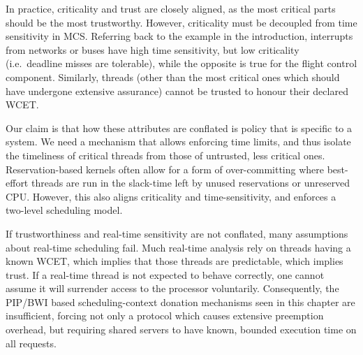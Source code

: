 In practice, criticality and trust are closely aligned, as the most
critical parts should be the most trustworthy.
However, criticality must be decoupled from time sensitivity in MCS.
Referring back to the
example in the introduction, interrupts from networks or buses have
high time sensitivity, but low criticality (i.e.\ deadline misses are
tolerable), while the opposite is true for the flight control component.
Similarly, threads (other than the most critical ones which should
have undergone extensive assurance) cannot be
trusted to honour their declared WCET.

Our claim is that how these attributes are conflated is
policy that is specific to a system.
We need a mechanism that allows  enforcing time limits, and thus
isolate the timeliness of critical threads from those of untrusted,
less critical ones.
Reservation-based kernels often allow for a form of over-committing where
best-effort threads are run in the slack-time left by unused reservations or unreserved CPU.
However, this also aligns criticality and time-sensitivity, and
enforces a two-level scheduling model.

If trustworthiness and real-time sensitivity are not conflated, many assumptions about real-time
scheduling fail.
Much real-time analysis rely on threads having a known \gls{WCET}, which implies that those threads
are predictable, which implies trust.
If a real-time thread is not expected to behave correctly, one cannot
assume it will surrender access to the processor voluntarily.
Consequently, the \gls{PIP}/\gls{BWI} based scheduling-context donation mechanisms seen in this chapter are
insufficient, forcing not only a protocol which causes extensive preemption overhead, but 
requiring shared servers to have known, bounded execution time on all requests.
